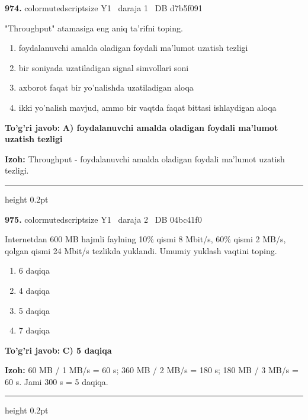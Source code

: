 \documentclass[10pt,a4paper,oneside]{article}
\begin{document}
\noindent\textbf{\color{ink}974.}  {color{muted}scriptsize Y1 \textbullet\ daraja 1 \textbullet\ DB d7b5f091}
\par
"Throughput" atamasiga eng aniq ta'rifni toping.
\begin{enumerate}[label=\Alph*),leftmargin=9mm]
\item foydalanuvchi amalda oladigan foydali ma'lumot uzatish tezligi
\item bir soniyada uzatiladigan signal simvollari soni
\item axborot faqat bir yo'nalishda uzatiladigan aloqa
\item ikki yo'nalish mavjud, ammo bir vaqtda faqat bittasi ishlaydigan aloqa
\end{enumerate}
\begin{tcolorbox}[enhanced,breakable,colback=teal!4,colframe=teal!50!black,boxrule=0.5pt,arc=1.1mm,left=3mm,right=3mm,top=1.7mm,bottom=1.7mm,before skip=2mm,after skip=2mm]
\textbf{\color{teal}To'g'ri javob:} \textbf{A) foydalanuvchi amalda oladigan foydali ma'lumot uzatish tezligi}
\par\smallskip
\textbf{Izoh:} Throughput - foydalanuvchi amalda oladigan foydali ma'lumot uzatish tezligi.
\end{tcolorbox}
\vspace{2mm}\hrule height 0.2pt \vspace{3mm}

\noindent\textbf{\color{ink}975.}  {color{muted}scriptsize Y1 \textbullet\ daraja 2 \textbullet\ DB 04bc41f0}
\par
Internetdan 600 MB hajmli faylning 10\% qismi 8 Mbit/s, 60\% qismi 2 MB/s, qolgan qismi 24 Mbit/s tezlikda yuklandi. Umumiy yuklash vaqtini toping.
\begin{enumerate}[label=\Alph*),leftmargin=9mm]
\item 6 daqiqa
\item 4 daqiqa
\item 5 daqiqa
\item 7 daqiqa
\end{enumerate}
\begin{tcolorbox}[enhanced,breakable,colback=teal!4,colframe=teal!50!black,boxrule=0.5pt,arc=1.1mm,left=3mm,right=3mm,top=1.7mm,bottom=1.7mm,before skip=2mm,after skip=2mm]
\textbf{\color{teal}To'g'ri javob:} \textbf{C) 5 daqiqa}
\par\smallskip
\textbf{Izoh:} 60 MB / 1 MB/s = 60 s; 360 MB / 2 MB/s = 180 s; 180 MB / 3 MB/s = 60 s. Jami 300 s = 5 daqiqa.
\end{tcolorbox}
\vspace{2mm}\hrule height 0.2pt \vspace{3mm}
\end{document}
